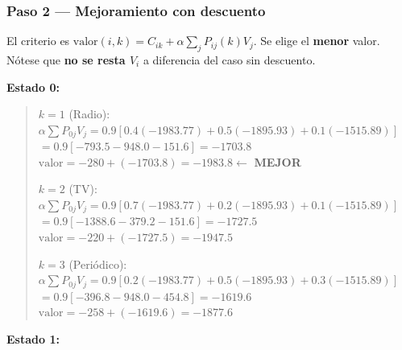 \documentclass[12pt,a4paper]{article}
\begin{document}
\subsubsection*{Paso 2 --- Mejoramiento con descuento}

El criterio es $\text{valor}(i,k) = C_{ik} + \alpha\sum_{j} P_{ij}(k)V_j$. Se elige el \textbf{menor} valor. Nótese que \textbf{no se resta $V_i$} a diferencia del caso sin descuento.

\vspace{0.3cm}
\textbf{Estado 0:}

\begin{quote}\footnotesize
$k=1$ (Radio):\;
$\alpha\sum P_{0j}V_j = 0.9[0.4(-1983.77) + 0.5(-1895.93) + 0.1(-1515.89)]$ \\
\hspace*{1.8cm} $= 0.9[-793.5 - 948.0 - 151.6] = -1703.8$ \\
\hspace*{1.8cm} $\text{valor} = -280 + (-1703.8) = \mathbf{-1983.8}$\quad $\leftarrow$ \textbf{MEJOR}

\vspace{3pt}
$k=2$ (TV):\;
$\alpha\sum P_{0j}V_j = 0.9[0.7(-1983.77) + 0.2(-1895.93) + 0.1(-1515.89)]$ \\
\hspace*{1.8cm} $= 0.9[-1388.6 - 379.2 - 151.6] = -1727.5$ \\
\hspace*{1.8cm} $\text{valor} = -220 + (-1727.5) = -1947.5$

\vspace{3pt}
$k=3$ (Periódico):\;
$\alpha\sum P_{0j}V_j = 0.9[0.2(-1983.77) + 0.5(-1895.93) + 0.3(-1515.89)]$ \\
\hspace*{1.8cm} $= 0.9[-396.8 - 948.0 - 454.8] = -1619.6$ \\
\hspace*{1.8cm} $\text{valor} = -258 + (-1619.6) = -1877.6$
\end{quote}

\vspace{0.3cm}
\textbf{Estado 1:}
\end{document}
